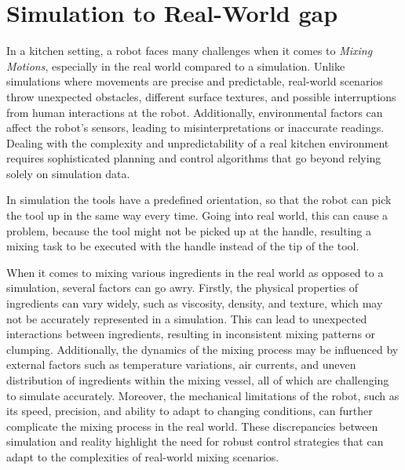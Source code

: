 \section{Simulation to Real-World gap}
\label{sec: simulation to real world gap}

In a kitchen setting, a robot faces many challenges when it comes to \textit{Mixing Motions}, especially in the real world compared to a simulation.
Unlike simulations where movements are precise and predictable, real-world scenarios throw unexpected obstacles, different surface textures, and possible interruptions from human interactions at the robot.
Additionally, environmental factors can affect the robot's sensors, leading to misinterpretations or inaccurate readings.
Dealing with the complexity and unpredictability of a real kitchen environment requires sophisticated planning and control algorithms that go beyond relying solely on simulation data.

In simulation the tools have a predefined orientation, so that the robot can pick the tool up in the same way every time.
Going into real world, this can cause a problem, because the tool might not be picked up at the handle, resulting
a mixing task to be executed with the handle instead of the tip of the tool.

When it comes to mixing various ingredients in the real world as opposed to a simulation, several factors can go awry. Firstly, the physical properties of ingredients can vary widely, such as viscosity, density, and texture, which may not be accurately represented in a simulation.
This can lead to unexpected interactions between ingredients, resulting in inconsistent mixing patterns or clumping. Additionally, the dynamics of the mixing process may be influenced by external factors such as temperature variations, air currents, and uneven distribution of ingredients within the mixing vessel, all of which are challenging to simulate accurately.
Moreover, the mechanical limitations of the robot, such as its speed, precision, and ability to adapt to changing conditions, can further complicate the mixing process in the real world.
These discrepancies between simulation and reality highlight the need for robust control strategies that can adapt to the complexities of real-world mixing scenarios.

